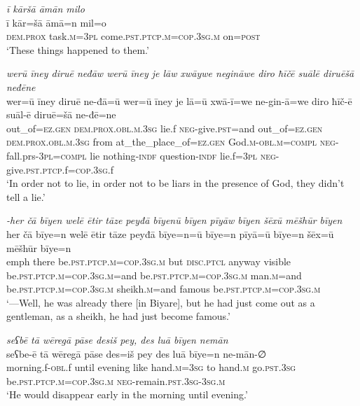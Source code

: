 \ea \label{BP.210}
\textit{ī kāršā āmān milo} \\ 
\gll ī kār=šā āmā=n mil=o \\ 
 \textsc{dem.prox} task\textsc{.m}\textsc{=3pl} come\textsc{.pst}\textsc{.ptcp}\textsc{.m}\textsc{=cop}\textsc{.3sg}\textsc{.m} on\textsc{=\textsc{post}} \\ 
\glt `These things happened to them.'
\z 
 
\ea \label{BP.211}
\textit{werū īney diruē neđāw werū īney je lāw xwāywe negināwe diro ħīčē suālē diruēšā neđēne} \\ 
\gll wer=ū īney diruē ne-đā=ū wer=ū īney je lā=ū xwā-ī=we ne-gin-ā=we diro ħīč-ē suāl-ē diruē=šā ne-đē=ne \\ 
 out\_of\textsc{=ez.gen} \textsc{dem.prox}\textsc{.obl}\textsc{.m}\textsc{.3sg} lie.f \textsc{neg-}give\textsc{.pst}=and out\_of\textsc{=ez.gen} \textsc{dem.prox}\textsc{.obl}\textsc{.m}\textsc{.3sg} from at\_the\_place\_of\textsc{=ez.gen} God\textsc{.m}\textsc{-obl}\textsc{.m}\textsc{=compl} \textsc{neg-}fall.prs\textsc{-3pl}\textsc{=compl} lie nothing\textsc{-indf} question\textsc{-indf} lie.f\textsc{=3pl} \textsc{neg-}give\textsc{.pst}\textsc{.ptcp}.f\textsc{=cop}\textsc{.3sg}.f \\ 
\glt `In order not to lie, in order not to be liars in the presence of God, they didn’t tell a lie.'
\z 
 
\ea \label{ŠJ.5}
\textit{-her čā bīyen welē ētir tāze peyđā bīyenū bīyen pīyāw bīyen šēxū mēšhūr bīyen} \\ 
\gll her čā bīye=n welē ētir tāze peyđā bīye=n=ū bīye=n pīyā=ū bīye=n šēx=ū mēšhūr bīye=n \\ 
 emph there be\textsc{.pst}\textsc{.ptcp}\textsc{.m}\textsc{=cop}\textsc{.3sg}\textsc{.m} but \textsc{disc.ptcl} anyway visible be\textsc{.pst}\textsc{.ptcp}\textsc{.m}\textsc{=cop}\textsc{.3sg}\textsc{.m}=and be\textsc{.pst}\textsc{.ptcp}\textsc{.m}\textsc{=cop}\textsc{.3sg}\textsc{.m} man\textsc{.m}=and be\textsc{.pst}\textsc{.ptcp}\textsc{.m}\textsc{=cop}\textsc{.3sg}\textsc{.m} sheikh\textsc{.m}=and famous be\textsc{.pst}\textsc{.ptcp}\textsc{.m}\textsc{=cop}\textsc{.3sg}\textsc{.m} \\ 
\glt `—Well, he was already there [in Biyare], but he had just come out as a gentleman, as a sheikh, he had just become famous.'
\z 
 
\ea \label{ŠJ.6}
\textit{seʕbē tā wēregā pāse desiš pey, des luā bīyen nemān} \\ 
\gll seʕbe-ē tā wēregā pāse des=iš pey des luā bīye=n ne-mān-∅ \\ 
 morning.f\textsc{-obl}.f until evening like hand\textsc{.m}\textsc{=3sg} to hand\textsc{.m} go\textsc{.pst}\textsc{.3sg} be\textsc{.pst}\textsc{.ptcp}\textsc{.m}\textsc{=cop}\textsc{.3sg}\textsc{.m} \textsc{neg-}remain\textsc{.pst}\textsc{.3sg}\textsc{-3sg}\textsc{.m} \\ 
\glt `He would disappear early in the morning until evening.'
\z 
 
